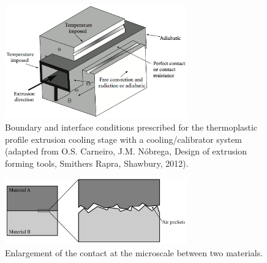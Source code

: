 \begin{figure}[!htp]
\centering
\includegraphics[width=0.7\textwidth]{chap1/include/figures/calibrator2.png}
\caption[Boundary and interface conditions prescribed for the thermoplastic profile extrusion cooling stage with a cooling/calibrator system.]{Boundary and interface conditions prescribed for the thermoplastic profile extrusion cooling stage with a cooling/calibrator system (adapted from O.S. Carneiro, J.M. N\'obrega, Design of extrusion forming tools, Smithers Rapra, Shawbury, 2012).}
\label{chap1:fig:mathematical_modelling_calibrator_boundary_conditions}
\end{figure}

\begin{figure}[!htb]
\centering
\includegraphics[width=0.7\textwidth]{chap1/include/figures/surface_roughness.png}
\caption{Enlargement of the contact at the microscale between two materials.}
\label{chap1:fig:mathematical_modelling_surface_roughness}
\end{figure}


